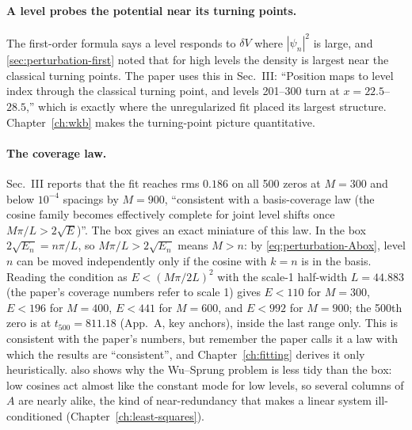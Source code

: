 \paragraph{A level probes the potential near its turning points.}
The first-order formula says a level responds to $\delta V$ where $|\psi_n|^2$ is large, and \cref{sec:perturbation-first} noted that for high levels the density is largest near the classical turning points. The paper uses this in Sec.~III: ``Position maps to level index through the classical turning point, and levels 201--300 turn at $x=22.5$--$28.5$,'' which is exactly where the unregularized fit placed its largest structure. Chapter~\ref{ch:wkb} makes the turning-point picture quantitative.

\paragraph{The coverage law.}
Sec.~III reports that the fit reaches rms $0.186$ on all 500 zeros at $M=300$ and below $10^{-4}$ spacings by $M=900$, ``consistent with a basis-coverage law (the cosine family becomes effectively complete for joint level shifts once $M\pi/L>2\sqrt E$)''. The box gives an exact miniature of this law. In the box $2\sqrt{E_n}=n\pi/L$, so $M\pi/L>2\sqrt{E_n}$ means $M>n$: by \cref{eq:perturbation-Abox}, level $n$ can be moved independently only if the cosine with $k=n$ is in the basis. Reading the condition as $E<(M\pi/2L)^2$ with the scale-1 half-width $L=44.883$ (the paper's coverage numbers refer to scale 1) gives $E<110$ for $M=300$, $E<196$ for $M=400$, $E<441$ for $M=600$, and $E<992$ for $M=900$; the 500th zero is at $t_{500}=811.18$ (App.~A, key anchors), inside the last range only. This is consistent with the paper's numbers, but remember the paper calls it a law with which the results are ``consistent'', and Chapter~\ref{ch:fitting} derives it only heuristically.  also shows why the Wu--Sprung problem is less tidy than the box: low cosines act almost like the constant mode for low levels, so several columns of $A$ are nearly alike, the kind of near-redundancy that makes a linear system ill-conditioned (Chapter~\ref{ch:least-squares}).

